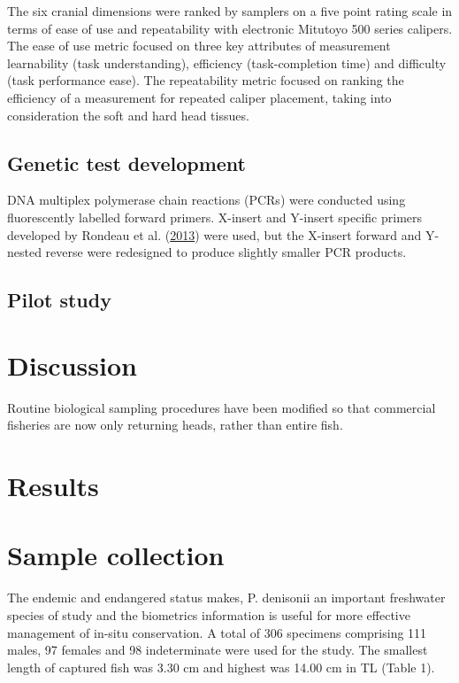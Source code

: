 \documentclass[12pt]{article}\usepackage[]{graphicx}\usepackage[]{color}
\begin{document}
The six cranial dimensions were ranked by samplers on a five point rating scale in terms of ease of use and repeatability with electronic Mitutoyo 500 series calipers. The ease of use metric focused on three key attributes of measurement learnability (task understanding), efficiency (task-completion time) and difficulty (task performance ease). The repeatability metric focused on ranking the efficiency of a measurement for repeated caliper placement, taking into consideration the soft and hard head tissues.

\hypertarget{genetic-test-development}{%
\subsection{Genetic test development}\label{genetic-test-development}}

DNA multiplex polymerase chain reactions (PCRs) were conducted using fluorescently labelled forward primers. X-insert and Y-insert specific primers developed by Rondeau et al. (\protect\hyperlink{ref-Rondeau2013}{2013}) were used, but the X-insert forward and Y-nested reverse were redesigned to produce slightly smaller PCR products.

\hypertarget{pilot-study}{%
\subsection{Pilot study}\label{pilot-study}}

\hypertarget{discussion}{%
\section{Discussion}\label{discussion}}

Routine biological sampling procedures have been modified so that commercial fisheries are now only returning heads, rather than entire fish.

\clearpage

\hypertarget{results}{%
\section{Results}\label{results}}

\hypertarget{sample-collection}{%
\section{Sample collection}\label{sample-collection}}

The endemic and endangered status makes, P. denisonii an important freshwater species of study and the biometrics information is useful for more effective management of in-situ conservation. A total of 306 specimens comprising 111 males, 97 females and 98 indeterminate were used for the study. The smallest length of captured fish was 3.30 cm and highest was 14.00 cm in TL (Table 1).
\end{document}
